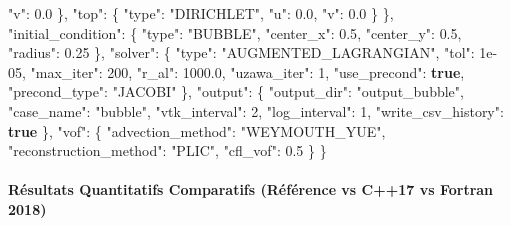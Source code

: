 \documentclass[
  10pt,
]{article}
\newenvironment{Shaded}{}{}
\newcommand{\DataTypeTok}[1]{\textcolor[rgb]{0.56,0.13,0.00}{#1}}
\newcommand{\DecValTok}[1]{\textcolor[rgb]{0.25,0.63,0.44}{#1}}
\newcommand{\FloatTok}[1]{\textcolor[rgb]{0.25,0.63,0.44}{#1}}
\newcommand{\FunctionTok}[1]{\textcolor[rgb]{0.02,0.16,0.49}{#1}}
\newcommand{\KeywordTok}[1]{\textcolor[rgb]{0.00,0.44,0.13}{\textbf{#1}}}
\newcommand{\StringTok}[1]{\textcolor[rgb]{0.25,0.44,0.63}{#1}}
\begin{document}
\begin{Shaded}
\begin{Highlighting}[]
      \DataTypeTok{"v"}\FunctionTok{:} \FloatTok{0.0}
    \FunctionTok{\},}
    \DataTypeTok{"top"}\FunctionTok{:} \FunctionTok{\{}
      \DataTypeTok{"type"}\FunctionTok{:} \StringTok{"DIRICHLET"}\FunctionTok{,}
      \DataTypeTok{"u"}\FunctionTok{:} \FloatTok{0.0}\FunctionTok{,}
      \DataTypeTok{"v"}\FunctionTok{:} \FloatTok{0.0}
    \FunctionTok{\}}
  \FunctionTok{\},}
  \DataTypeTok{"initial\_condition"}\FunctionTok{:} \FunctionTok{\{}
    \DataTypeTok{"type"}\FunctionTok{:} \StringTok{"BUBBLE"}\FunctionTok{,}
    \DataTypeTok{"center\_x"}\FunctionTok{:} \FloatTok{0.5}\FunctionTok{,}
    \DataTypeTok{"center\_y"}\FunctionTok{:} \FloatTok{0.5}\FunctionTok{,}
    \DataTypeTok{"radius"}\FunctionTok{:} \FloatTok{0.25}
  \FunctionTok{\},}
  \DataTypeTok{"solver"}\FunctionTok{:} \FunctionTok{\{}
    \DataTypeTok{"type"}\FunctionTok{:} \StringTok{"AUGMENTED\_LAGRANGIAN"}\FunctionTok{,}
    \DataTypeTok{"tol"}\FunctionTok{:} \DecValTok{1e{-}05}\FunctionTok{,}
    \DataTypeTok{"max\_iter"}\FunctionTok{:} \DecValTok{200}\FunctionTok{,}
    \DataTypeTok{"r\_al"}\FunctionTok{:} \FloatTok{1000.0}\FunctionTok{,}
    \DataTypeTok{"uzawa\_iter"}\FunctionTok{:} \DecValTok{1}\FunctionTok{,}
    \DataTypeTok{"use\_precond"}\FunctionTok{:} \KeywordTok{true}\FunctionTok{,}
    \DataTypeTok{"precond\_type"}\FunctionTok{:} \StringTok{"JACOBI"}
  \FunctionTok{\},}
  \DataTypeTok{"output"}\FunctionTok{:} \FunctionTok{\{}
    \DataTypeTok{"output\_dir"}\FunctionTok{:} \StringTok{"output\_bubble"}\FunctionTok{,}
    \DataTypeTok{"case\_name"}\FunctionTok{:} \StringTok{"bubble"}\FunctionTok{,}
    \DataTypeTok{"vtk\_interval"}\FunctionTok{:} \DecValTok{2}\FunctionTok{,}
    \DataTypeTok{"log\_interval"}\FunctionTok{:} \DecValTok{1}\FunctionTok{,}
    \DataTypeTok{"write\_csv\_history"}\FunctionTok{:} \KeywordTok{true}
  \FunctionTok{\},}
  \DataTypeTok{"vof"}\FunctionTok{:} \FunctionTok{\{}
    \DataTypeTok{"advection\_method"}\FunctionTok{:} \StringTok{"WEYMOUTH\_YUE"}\FunctionTok{,}
    \DataTypeTok{"reconstruction\_method"}\FunctionTok{:} \StringTok{"PLIC"}\FunctionTok{,}
    \DataTypeTok{"cfl\_vof"}\FunctionTok{:} \FloatTok{0.5}
  \FunctionTok{\}}
\FunctionTok{\}}
\end{Highlighting}
\end{Shaded}

\paragraph{Résultats Quantitatifs Comparatifs (Référence vs C++17 vs
Fortran
2018)}\label{ruxe9sultats-quantitatifs-comparatifs-ruxe9fuxe9rence-vs-c17-vs-fortran-2018-12}
\end{document}
